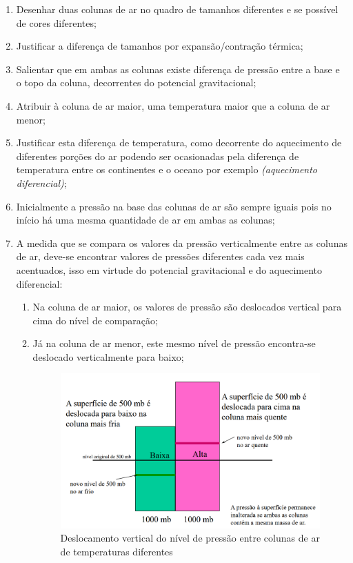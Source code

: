 \begin{enumerate}[label=\roman *)]
		\item Desenhar duas colunas de ar no quadro de tamanhos diferentes e se possível de cores diferentes;
		\item Justificar a diferença de tamanhos por expansão/contração térmica;
		\item Salientar que em ambas as colunas existe diferença de pressão entre a base e o topo da coluna, decorrentes do potencial gravitacional;
		\item Atribuir à coluna de ar maior, uma temperatura maior que a coluna de ar menor;
		\item Justificar esta diferença de temperatura, como decorrente do aquecimento de diferentes porções do ar podendo ser ocasionadas pela diferença de temperatura entre os continentes e o oceano por exemplo \textit{(aquecimento diferencial)};
		\item Inicialmente a pressão na base das colunas de ar são sempre iguais pois no início há uma mesma quantidade de ar em ambas as colunas;
		\item A medida que se compara os valores da pressão verticalmente entre as colunas de ar, deve-se encontrar valores de pressões diferentes cada vez mais acentuados, isso em virtude do potencial gravitacional e do aquecimento diferencial:
			\begin{enumerate}[label=\alph *)]
					\item Na coluna de ar maior, os valores de pressão são deslocados vertical para cima do nível de comparação;
					\item Já na coluna de ar menor, este mesmo nível de pressão encontra-se deslocado verticalmente para baixo;
						\begin{figure}[htb!]
							\centering
							\includegraphics[width=.7\linewidth]{assets/deslocamento-ar-01.png}
							\caption{Deslocamento vertical do nível de pressão entre colunas de ar de temperaturas diferentes}
							\label{fig:gradiente01}

\end{figure}
\end{enumerate}
\end{enumerate}
